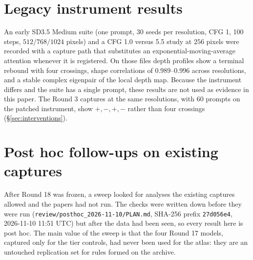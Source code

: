 \section{Legacy instrument results}\label{app:legacy}
An early SD3.5 Medium suite (one prompt, 30 seeds per resolution, CFG 1, 100 steps, $512/768/1024$ pixels) and a CFG 1.0 versus 5.5 study at $256$ pixels were recorded with a capture path that substitutes an exponential-moving-average attention whenever it is registered. On those files depth profiles show a terminal rebound with four crossings, shape correlations of $0.989$--$0.996$ across resolutions, and a stable complex eigenpair of the local depth map. Because the instrument differs and the suite has a single prompt, these results are not used as evidence in this paper. The Round 3 captures at the same resolutions, with 60 prompts on the patched instrument, show $+,-,+,-$ rather than four crossings (\S\ref{sec:interventions}).

\section{Post hoc follow-ups on existing captures}\label{supp:posthoc}
After Round 18 was frozen, a sweep looked for analyses the existing captures allowed and the papers had not run. The checks were written down before they were run (\texttt{review/posthoc\_2026-11-10/\allowbreak PLAN.md}, SHA-256 prefix \texttt{27d056e4}, 2026-11-10 11:51 UTC) but after the data had been seen, so every result here is post hoc. The main value of the sweep is that the four Round 17 models, captured only for the tier controls, had never been used for the atlas: they are an untouched replication set for rules formed on the archive.

